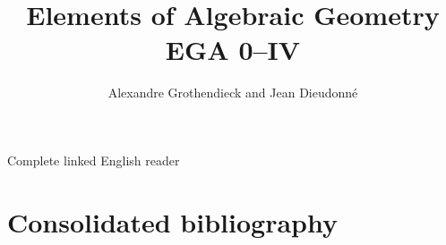 


\setlength{\emergencystretch}{3em}


\newcommand{\EGAResetVolumeCounters}{%
  \setcounter{section}{0}%
  \setcounter{subsection}{0}%
  \setcounter{equation}{0}%
  \setcounter{figure}{0}%
  \setcounter{table}{0}%
  \setcounter{footnote}{0}%
}

\newcommand{\EGAVolumeTitlePage}[3]{%
  \clearpage
  \EGAResetVolumeCounters
  \renewcommand*{\theHtable}{#1.\arabic{table}}%
  \phantomsection
  \label{section:#1}%
  \pdfbookmark[0]{#2: #3}{volume.#1}%
  \addcontentsline{toc}{part}{#2: #3}%
  \thispagestyle{empty}%
  \vspace*{\fill}%
  \begin{center}
    {\Huge\bfseries #2\par}
    \vspace{1.5em}
    {\LARGE #3\par}
    \vspace{2em}
    {\large Alexandre Grothendieck and Jean Dieudonn\'e\par}
    \vspace{1em}
    {\large English reader\par}
  \end{center}
  \vspace*{\fill}%
  \clearpage
}



\title{Elements of Algebraic Geometry\\EGA 0--IV}
\author{Alexandre Grothendieck and Jean Dieudonn\'e}
\date{}
\maketitle

\label{reader:ega-global}

\begin{center}
\large Complete linked English reader
\end{center}

\tableofcontents







\clearpage
{}
{}
\section*{Consolidated bibliography}
\nocite{*}




